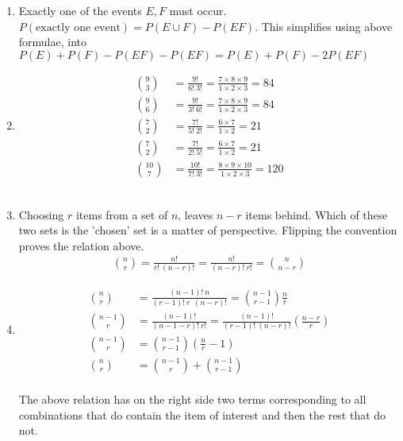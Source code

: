 \begin{enumerate}
	\item Exactly one of the events $ E, F $ must occur.
	$ P(\text{exactly one event}) = P(E \cup F) - P(EF) $. This simplifies using above formulae, into \\
	$ P(E) + P(F) - P(EF) - P(EF) = P(E) + P(F) - 2P(EF)$ \\
	
	\item 
		\begin{align}
			\binom{9}{3} &= \frac{9!}{6!\ 3!} = \frac{7 \times 8 \times 9}{1 \times 2 \times 3} = 84 \\
			\binom{9}{6} &= \frac{9!}{3!\ 6!} = \frac{7 \times 8 \times 9}{1 \times 2 \times 3} = 84 \\
			\binom{7}{2} &= \frac{7!}{5!\ 2!} = \frac{6 \times 7}{1 \times 2} = 21 \\
			\binom{7}{2} &= \frac{7!}{2!\ 5!} = \frac{6 \times 7}{1 \times 2} = 21 \\
			\binom{10}{7} &= \frac{10!}{7!\ 3!} = \frac{8 \times 9 \times 10}{1 \times 2 \times 3} = 120
		\end{align}
	 \\
	
	\item Choosing $ r $ items from a set of $ n $, leaves $ n-r $ items behind. Which of these two sets is the 'chosen' set is a matter of perspective. Flipping the convention proves the relation above.
	\begin{align}
		\binom{n}{r} = \frac{n!}{r!\ (n-r)!} = \frac{n!}{(n-r)!\ r!} = \binom{n}{n-r}
	\end{align}
	
	\item 	
		\begin{align}
			\binom{n}{r} &= \frac{(n - 1)!\ n}{(r - 1)!\ r\ \ (n-r)!} = \binom{n-1}{r-1} \frac{n}{r} \\
			\binom{n-1}{r} &= \frac{(n-1)!}{(n-1-r)!\ r!} = \frac{(n-1)!}{(r-1)!\ (n-r)!} \left( \frac{n-r}{r} \right) \\
			\binom{n-1}{r} &= \binom{n-1}{r-1} \left( \frac{n}{r} - 1 \right) \\
			\binom{n}{r} &= \binom{n-1}{r} + \binom{n-1}{r-1} 
		\end{align}
	 \\
	
	The above relation has on the right side two terms corresponding to all combinations that do contain the item of interest and then the rest that do not.
	

\end{enumerate}
